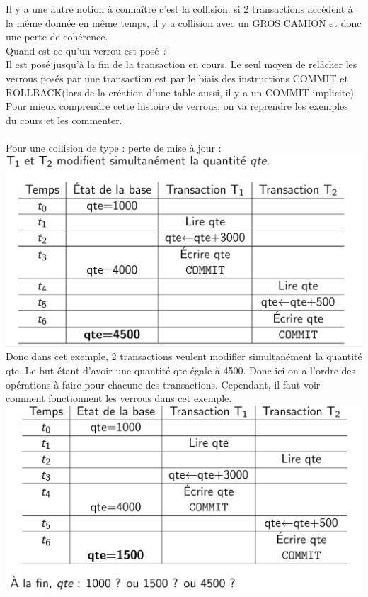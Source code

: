 \documentclass{report}
\begin{document}
Il y a une autre notion à connaître c'est la collision. si 2 transactions accèdent à la même donnée en même temps, il y a collision avec un GROS CAMION et donc une perte de cohérence.\\
Quand est ce qu'un verrou est posé ?\\
Il est posé jusqu'à la fin de la transaction en cours. Le seul moyen de relâcher les verrous posés par une transaction est par le biais des instructions COMMIT et ROLLBACK(lors de la création d'une table aussi, il y a un COMMIT implicite).\\
Pour mieux comprendre cette histoire de verrous, on va reprendre les exemples du cours et les commenter.\\\\
Pour une collision de type : perte de mise à jour :\\
\includegraphics[scale=0.3]{./Pictures/BD1.PNG}\\
Donc dans cet exemple, 2 transactions veulent modifier simultanément la quantité qte. Le but étant d'avoir une quantité qte égale à 4500. Donc ici on a l'ordre des opérations à faire pour chacune des transactions. Cependant, il faut voir comment fonctionnent les verrous dans cet exemple.\\
\includegraphics[scale=0.3]{./Pictures/BD2.PNG}\\
\end{document}
